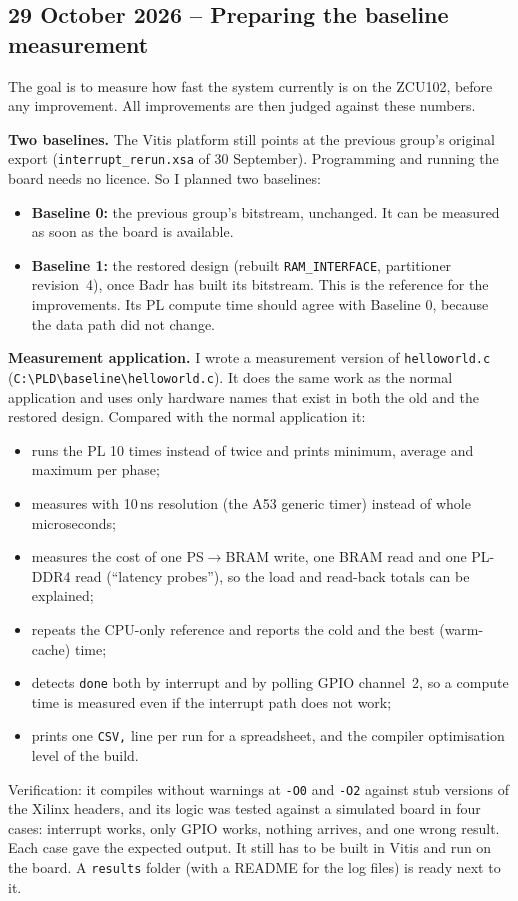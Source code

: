 \documentclass[11pt,a4paper]{article}
\newcommand{\code}[1]{\texttt{#1}}
\begin{document}
\subsection{29 October 2026 -- Preparing the baseline measurement}
The goal is to measure how fast the system currently is on the ZCU102, before any improvement. All improvements are then judged against these numbers.

\textbf{Two baselines.} The Vitis platform still points at the previous group's original export (\code{interrupt\_rerun.xsa} of 30 September). Programming and running the board needs no licence. So I planned two baselines:
\begin{itemize}[noitemsep]
  \item \textbf{Baseline 0:} the previous group's bitstream, unchanged. It can be measured as soon as the board is available.
  \item \textbf{Baseline 1:} the restored design (rebuilt \code{RAM\_INTERFACE}, partitioner revision~4), once Badr has built its bitstream. This is the reference for the improvements. Its PL compute time should agree with Baseline 0, because the data path did not change.
\end{itemize}

{\sloppy \textbf{Measurement application.} I wrote a measurement version of \code{helloworld.c} (\code{C:\textbackslash PLD\textbackslash baseline\textbackslash}\allowbreak\code{helloworld.c}). It does the same work as the normal application and uses only hardware names that exist in both the old and the restored design. Compared with the normal application it:\par}
\begin{itemize}[noitemsep]
  \item runs the PL 10 times instead of twice and prints minimum, average and maximum per phase;
  \item measures with 10\,ns resolution (the A53 generic timer) instead of whole microseconds;
  \item measures the cost of one PS$\rightarrow$BRAM write, one BRAM read and one PL-DDR4 read (``latency probes''), so the load and read-back totals can be explained;
  \item repeats the CPU-only reference and reports the cold and the best (warm-cache) time;
  \item detects \code{done} both by interrupt and by polling GPIO channel~2, so a compute time is measured even if the interrupt path does not work;
  \item prints one \code{CSV,} line per run for a spreadsheet, and the compiler optimisation level of the build.
\end{itemize}
Verification: it compiles without warnings at \code{-O0} and \code{-O2} against stub versions of the Xilinx headers, and its logic was tested against a simulated board in four cases: interrupt works, only GPIO works, nothing arrives, and one wrong result. Each case gave the expected output. It still has to be built in Vitis and run on the board. A \code{results} folder (with a README for the log files) is ready next to it.
\end{document}
